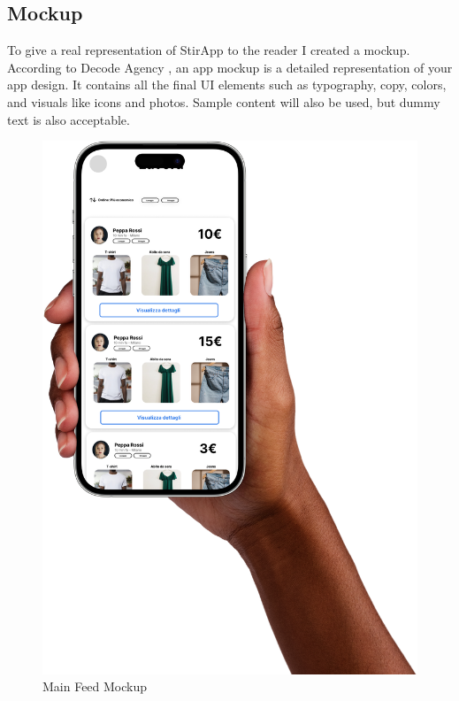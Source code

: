 \subsection{Mockup}
To give a real representation of StirApp to the reader I created a mockup. According to Decode Agency \cite{decodeagency}, an app mockup is a detailed representation of your app design. It contains all the final UI elements such as typography, copy, colors, and visuals like icons and photos. Sample content will also be used, but dummy text is also acceptable.
\begin{figure}[hbtp]
\caption{Main Feed Mockup}
\centering
\includegraphics[scale=0.1]{../Images/mockup02.png}
\end{figure}
